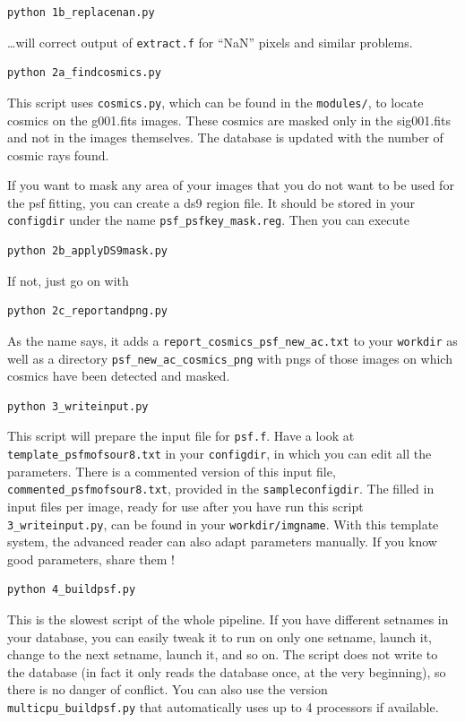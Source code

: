\begin{Verbatim}
python 1b_replacenan.py
\end{Verbatim}
\ldots will correct output of \verb+extract.f+ for ``NaN'' pixels and similar problems.

\begin{Verbatim}
python 2a_findcosmics.py
\end{Verbatim}
This script uses \verb+cosmics.py+, which can be found in the \verb+modules/+, to locate cosmics on the g001.fits images. These cosmics are masked only in the sig001.fits and not in the images themselves. The database is updated with the number of cosmic rays found.

If you want to mask any area of your images that you do not want to be used for the psf fitting, you can create a ds9 region file. It should be stored in your \verb+configdir+ under the name \verb+psf_psfkey_mask.reg+. Then you can execute 

\begin{Verbatim}
python 2b_applyDS9mask.py
\end{Verbatim}
If not, just go on with

\begin{Verbatim}
python 2c_reportandpng.py
\end{Verbatim}
As the name says, it adds a \verb+report_cosmics_psf_new_ac.txt+ to your \verb+workdir+ as well as a directory \verb+psf_new_ac_cosmics_png+ with pngs of those images on which cosmics have been detected and masked.

\begin{Verbatim}
python 3_writeinput.py
\end{Verbatim}
This script will prepare the input file for \verb+psf.f+. Have a look at \verb+template_psfmofsour8.txt+ in your \verb+configdir+, in which you can edit all the parameters. There is a commented version of this input file, \verb+commented_psfmofsour8.txt+, provided in the \verb+sampleconfigdir+. The filled in input files per image, ready for use after you have run this script \verb+3_writeinput.py+, can be found in your \verb+workdir/imgname+.
With this template system, the advanced reader can also adapt parameters manually. If you know good parameters, share them !

\begin{Verbatim}
python 4_buildpsf.py
\end{Verbatim}
This is the slowest script of the whole pipeline. If you have different setnames in your database, you can easily tweak it to run on only one setname, launch it, change to the next setname, launch it, and so on. The script does not write to the database (in fact it only reads the database once, at the very beginning), so there is no danger of conflict.
You can also use the version \verb+multicpu_buildpsf.py+ that automatically uses up to 4 processors if available.

